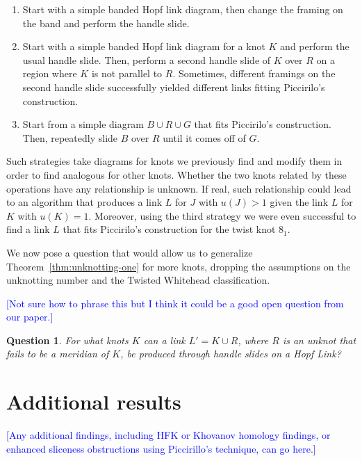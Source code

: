 \documentclass[11pt,usenames,dvipsnames,reqno]{amsart}
\numberwithin{theorem}{section}
\newtheorem{question}[theorem]{Question}
\theoremstyle{ex}
\theoremstyle{rem}
\def\kh#1{\textcolor{Blue}{#1}}
\begin{document}
\begin{enumerate}
	\item Start with a simple banded Hopf link diagram, then change the framing on the band and perform the handle slide.
	\item Start with a simple banded Hopf link diagram for a knot $K$ and perform the usual handle slide. Then, perform a second handle slide of $K$ over $R$ on a region where $K$ is not parallel to $R$. Sometimes, different framings on the second handle slide successfully yielded different links fitting Piccirilo's construction.
	\item Start from a simple diagram $B \cup R \cup G$ that fits Piccirilo's construction. Then, repeatedly slide $B$ over $R$ until it comes off of $G$.
\end{enumerate}

Such strategies take diagrams for knots we previously find and modify them in order to find analogous for other knots. Whether the two knots related by these operations have any relationship is unknown. If real, such relationship could lead to an algorithm that produces a link $L$ for $J$ with $u(J) > 1$ given the link $L$ for $K$ with $u(K) = 1$. Moreover, using the third strategy we were even successful to find a link $L$ that fits Piccirilo's construction for the twist knot $8_1$.

We now pose a question that would allow us to generalize Theorem~\ref{thm:unknotting-one} for more knots, dropping the assumptions on the unknotting number and the Twisted Whitehead classification.

\kh{[Not sure how to phrase this but I think it could be a good open question from our paper.]}
\begin{question}
	For what knots $K$ can a link $L' = K \cup R$, where $R$ is an unknot that fails to be a meridian of $K$, be produced through handle slides on a Hopf Link?
\end{question}

\section{Additional results}

\kh{[Any additional findings, including HFK or Khovanov homology findings, or enhanced sliceness obstructions using Piccirillo's technique, can go here.]}




\end{document}
